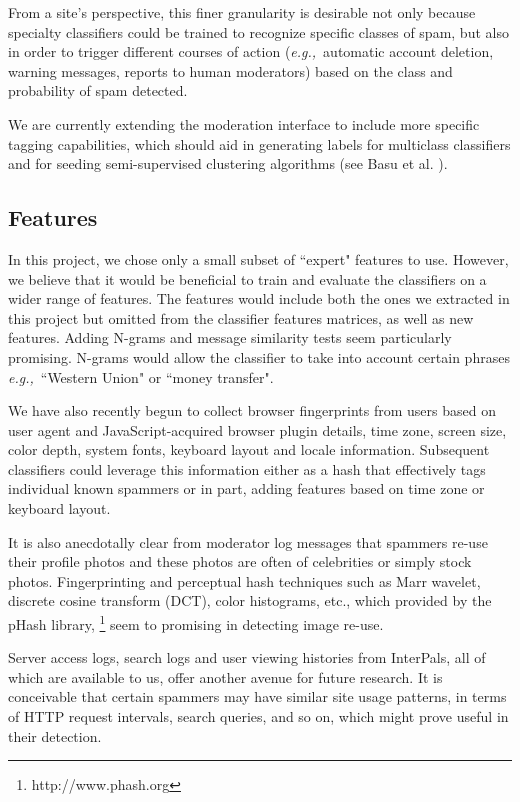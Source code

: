 \documentclass[preprint]{acm_proc_article-sp}
\newcommand{\eg}{{\em e.g.,}~}
\begin{document}
From a site's perspective, this finer granularity is desirable not only 
because specialty classifiers could be trained to recognize specific classes of spam, but also in order to 
trigger different courses of action (\eg automatic account deletion, warning messages, reports to human moderators) 
based on the class and probability of spam detected.

We are currently extending the moderation interface to include more specific tagging capabilities, which should aid 
in generating labels for multiclass classifiers and for seeding semi-supervised clustering algorithms (see Basu et al. 
\cite{basu}).

\subsection{Features}

In this project, we chose only a small subset of ``expert" features to use. However, we believe that 
it would be beneficial to train and evaluate the classifiers on a wider range of features. The features 
would include both the ones we extracted in this project but omitted from the classifier features matrices, 
as well as new features. Adding N-grams and message similarity tests seem particularly promising. 
N-grams would allow the classifier to take into account certain phrases \eg{``Western Union" or ``money transfer"}. 

We have also recently begun to collect browser fingerprints from users based on user agent 
and JavaScript-acquired browser plugin details, time zone, screen size, color depth, system fonts, 
keyboard layout and locale information. Subsequent classifiers could leverage this information either 
as a hash that effectively tags individual known spammers or in part, adding features based on 
time zone or keyboard layout.

It is also anecdotally clear from moderator log messages that spammers re-use their profile photos and 
these photos are often of celebrities or simply stock photos. Fingerprinting and perceptual hash techniques 
such as Marr wavelet, discrete cosine transform (DCT), color histograms, etc., which provided by the 
pHash library, \footnote{http://www.phash.org} seem to promising in detecting image re-use. 

Server access logs, search logs and user viewing histories from InterPals, all of which 
are available to us, offer another avenue for future research. It is conceivable that certain 
spammers may have similar site usage patterns, in terms of HTTP request intervals, search queries, 
and so on, which might prove useful in their detection.
\end{document}

